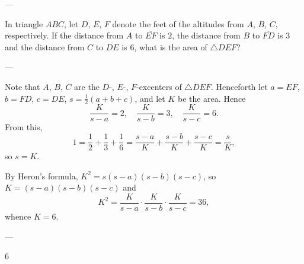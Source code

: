 
---

In triangle $ABC$, let $D$, $E$, $F$ denote the feet of the altitudes from $A$, $B$, $C$, respectively. If the distance from $A$ to $\overline{EF}$ is $2$, the distance from $B$ to $\overline{FD}$ is $3$ and the distance from $C$ to $\overline{DE}$ is $6$, what is the area of $\triangle DEF$?

---

Note that $A$, $B$, $C$ are the $D$-, $E$-, $F$-excenters of $\triangle DEF$. Henceforth let $a=EF$, $b=FD$, $c=DE$, $s=\frac12(a+b+c)$, and let $K$ be the area. Hence \[\frac K{s-a}=2,\quad\frac K{s-b}=3,\quad\frac K{s-c}=6.\]
From this, \[1=\frac12+\frac13+\frac16=\frac{s-a}K+\frac{s-b}K+\frac{s-c}K=\frac sK,\]
so $s=K$.

By Heron's formula, $K^2=s(s-a)(s-b)(s-c)$, so $K=(s-a)(s-b)(s-c)$ and \[K^2=\frac K{s-a}\cdot\frac K{s-b}\cdot\frac K{s-c}=36,\]
whence $K=6$.

---

6
